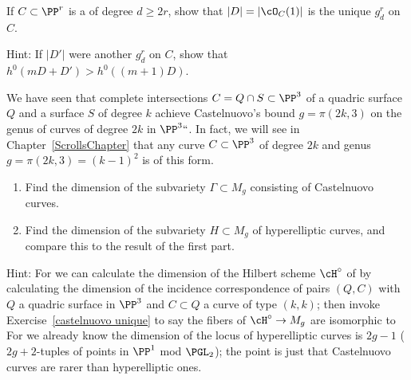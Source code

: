 \begin{exercise}\label{castelnuovo unique}
If $C \subset \PP^r$ is a 
%
of degree $d \geq 2r$,
show that $|D| = |\cO_C(1)|$ is the unique $g^r_d$ on $C$.

Hint: If $|D'|$ were another $g^r_d$ on $C$, show that $h^0(mD + D')
> h^0((m+1)D)$.
\end{exercise}


\begin{exercise}\label{rarity of Castelnuovo}
We have seen that complete intersections $C = Q \cap S \subset \PP^3$ of a
quadric surface $Q$ and a surface $S$ of degree $k$ achieve Castelnuovo's
bound $g = \pi(2k, 3)$ on the genus of curves of degree $2k$ in $\PP^3`
`$. In fact, we will see in Chapter~\ref{ScrollsChapter} that any curve
$C \subset \PP^3$ of degree $2k$ and genus $g = \pi(2k, 3) = (k-1)^2$
is of this form.
\begin{enumerate}
\item Find the dimension of the subvariety $\Gamma \subset M_g$ consisting
of Castelnuovo curves.
\item Find the dimension of the subvariety $H \subset M_g$ of
hyperelliptic curves, and compare this to the result of the first part.
\end{enumerate}

Hint: For 
we can calculate the dimension of the Hilbert
scheme $\cH^\circ$ of 
%
by calculating the dimension
of the incidence correspondence of pairs $(Q, C)$ with $Q$ a quadric
surface in $\PP^3$ and $C \subset Q$ a curve of type $(k,k)$; then invoke
Exercise~\ref{castelnuovo unique} to say the fibers of $\cH^\circ \to
M_g$ are isomorphic to 
%
%
For 
we already know the
dimension of the locus of hyperelliptic curves is $2g-1$ ($2g+2$-tuples
of points in $\PP^1$ mod $\PGL_2$); the point is just that Castelnuovo
curves are rarer than hyperelliptic ones.
\end{exercise}






